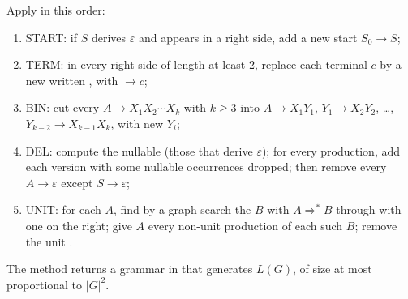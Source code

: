 \begin{method}\label{met:b2:context-free-languages:cnf}
Apply in this order:
\begin{enumerate}
\item START: if $S$ derives $\varepsilon$ and appears in a right side, add a new start $S_0 \to S$;
\item TERM: in every right side of length at least 2, replace each terminal $c$ by a new  written
, with  $\to c$;
\item BIN: cut every $A \to X_1 X_2 \cdots X_k$ with $k \ge 3$ into $A \to X_1 Y_1$, $Y_1 \to X_2 Y_2$, \dots, $Y_{k-2}
\to X_{k-1} X_k$, with new  $Y_i$;
\item DEL: compute the nullable  (those that derive $\varepsilon$); for every production, add each version
with some nullable occurrences dropped; then remove every $A \to \varepsilon$ except $S \to \varepsilon$;
\item UNIT: for each $A$, find by a graph search the  $B$ with $A \Rightarrow^* B$ through  with
one  on the right; give $A$ every non-unit production of each such $B$; remove the unit .
\end{enumerate}
\end{method}

\label{lst:b2:context-free-languages:cnf1}

\label{lst:b2:context-free-languages:cnf2}

\begin{proposition}\label{prop:b2:context-free-languages:cnf}
The method returns a grammar in  that generates $L(G)$, of size at most proportional to $|G|^2$.
\end{proposition}

